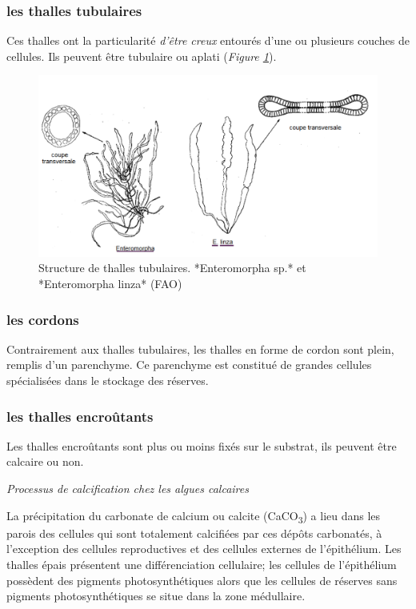 \documentclass[
]{book}
\begin{document}
\hypertarget{les-thalles-tubulaires}{%
\subsubsection{les thalles tubulaires}\label{les-thalles-tubulaires}}

Ces thalles ont la particularité \emph{d'être creux} entourés d'une ou plusieurs couches de cellules. Ils peuvent être tubulaire ou aplati (\emph{Figure \ref{fig:thalletube}}).

\begin{figure}[H]

{\centering \includegraphics[width=0.7\linewidth]{./images/thalletube} 

}

\caption{Structure de thalles tubulaires. *Enteromorpha sp.* et *Enteromorpha linza* (FAO)}\label{fig:thalletube}
\end{figure}

\hypertarget{les-cordons}{%
\subsubsection{les cordons}\label{les-cordons}}

Contrairement aux thalles tubulaires, les thalles en forme de cordon sont plein, remplis d'un parenchyme. Ce parenchyme est constitué de grandes cellules spécialisées dans le stockage des réserves.

\hypertarget{les-thalles-encrouxfbtants}{%
\subsubsection{les thalles encroûtants}\label{les-thalles-encrouxfbtants}}

Les thalles encroûtants sont plus ou moins fixés sur le substrat, ils peuvent être calcaire ou non.

\emph{Processus de calcification chez les algues calcaires}

La précipitation du carbonate de calcium ou calcite (CaCO\textsubscript{3}) a lieu dans les parois des cellules qui sont totalement calcifiées par ces dépôts carbonatés, à l'exception des cellules reproductives et des cellules externes de l'épithélium. Les thalles épais présentent une différenciation cellulaire; les cellules de l'épithélium possèdent des pigments photosynthétiques alors que les cellules de réserves sans pigments photosynthétiques se situe dans la zone médullaire.
\end{document}
